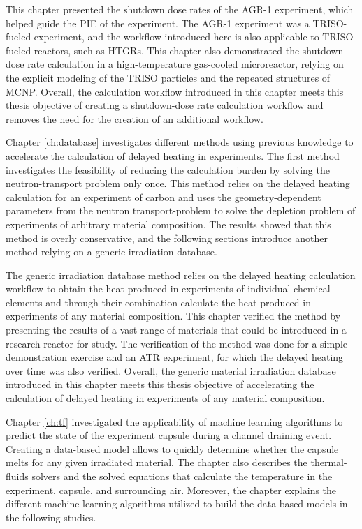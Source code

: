 This chapter presented the shutdown dose rates of the AGR-1 experiment, which helped guide the PIE of the experiment.
The AGR-1 experiment was a TRISO-fueled experiment, and the workflow introduced here is also applicable to TRISO-fueled reactors, such as HTGRs.
This chapter also demonstrated the shutdown dose rate calculation in a high-temperature gas-cooled microreactor, relying on the explicit modeling of the TRISO particles and the repeated structures of MCNP.
Overall, the calculation workflow introduced in this chapter meets this thesis objective of creating a shutdown-dose rate calculation workflow and removes the need for the creation of an additional workflow.


Chapter \ref{ch:database} investigates different methods using previous knowledge to accelerate the calculation of delayed heating in experiments.
The first method investigates the feasibility of reducing the calculation burden by solving the neutron-transport problem only once.
This method relies on the delayed heating calculation for an experiment of carbon and uses the geometry-dependent parameters from the neutron transport-problem to solve the depletion problem of experiments of arbitrary material composition.
The results showed that this method is overly conservative, and the following sections introduce another method relying on a generic irradiation database.

The generic irradiation database method relies on the delayed heating calculation workflow to obtain the heat produced in experiments of individual chemical elements and through their combination calculate the heat produced in experiments of any material composition.
This chapter verified the method by presenting the results of a vast range of materials that could be introduced in a research reactor for study.
The verification of the method was done for a simple demonstration exercise and an ATR experiment, for which the delayed heating over time was also verified.
Overall, the generic material irradiation database introduced in this chapter meets this thesis objective of accelerating the calculation of delayed heating in experiments of any material composition.

Chapter \ref{ch:tf} investigated the applicability of machine learning algorithms to predict the state of the experiment capsule during a channel draining event.
Creating a data-based model allows to quickly determine whether the capsule melts for any given irradiated material.
The chapter also describes the thermal-fluids solvers and the solved equations that calculate the temperature in the experiment, capsule, and surrounding air.
Moreover, the chapter explains the different machine learning algorithms utilized to build the data-based models in the following studies.

